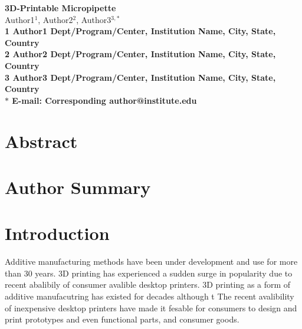 \date{}

\pagestyle{myheadings}







\begin{flushleft}
{\Large
\textbf{3D-Printable Micropipette}
}
\\
Author1$^{1}$, 
Author2$^{2}$, 
Author3$^{3,\ast}$
\\
\bf{1} Author1 Dept/Program/Center, Institution Name, City, State, Country
\\
\bf{2} Author2 Dept/Program/Center, Institution Name, City, State, Country
\\
\bf{3} Author3 Dept/Program/Center, Institution Name, City, State, Country
\\
$\ast$ E-mail: Corresponding author@institute.edu
\end{flushleft}

\section*{Abstract}

\section*{Author Summary}



\section*{Introduction}

Additive manufacturing methods have been under development and use for more than 30 years.
3D printing has experienced a sudden surge in popularity due to recent abalibily of consumer avalible desktop printers. 
3D printing as a form of additive manufacutring has existed for decades although t
The recent avalibility of inexpensive desktop printers have made it fesable for consumers to design and print prototypes and even functional parts, and consumer goods.

